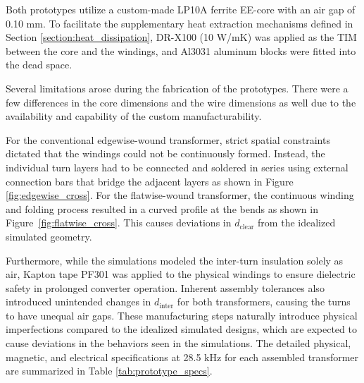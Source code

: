 Both prototypes utilize a custom-made LP10A ferrite EE-core with an air gap of 0.10 mm. To facilitate the supplementary heat extraction mechanisms defined in Section \ref{section:heat_dissipation}, DR-X100 (10 W/mK) was applied as the TIM between the core and the windings, and Al3031 aluminum blocks were fitted into the dead space. 

Several limitations arose during the fabrication of the prototypes. There were a few differences in the core dimensions and the wire dimensions as well due to the availability and capability of the custom manufacturability. 

For the conventional edgewise-wound transformer, strict spatial constraints dictated that the windings could not be continuously formed. Instead, the individual turn layers had to be connected and soldered in series using external connection bars that bridge the adjacent layers as shown in Figure \ref{fig:edgewise_cross}. For the flatwise-wound transformer, the continuous winding and folding process resulted in a curved profile at the bends as shown in Figure~\ref{fig:flatwise_cross}. This causes deviations in $d_\mathrm{clear}$ from the idealized simulated geometry. 

Furthermore, while the simulations modeled the inter-turn insulation solely as air, Kapton tape PF301 was applied to the physical windings to ensure dielectric safety in prolonged converter operation. Inherent assembly tolerances also introduced unintended changes in $d_{\mathrm{inter}}$ for both transformers, causing the turns to have unequal air gaps. These manufacturing steps naturally introduce physical imperfections compared to the idealized simulated designs, which are expected to cause deviations in the behaviors seen in the simulations. The detailed physical, magnetic, and electrical specifications at 28.5 kHz for each assembled transformer are summarized in Table \ref{tab:prototype_specs}.

